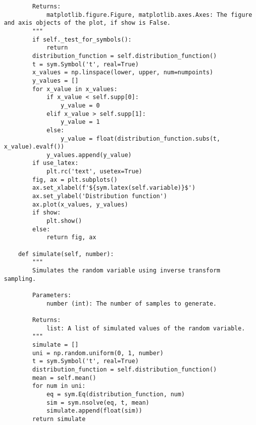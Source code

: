 \begin{small}
\begin{lstlisting}
        Returns:
            matplotlib.figure.Figure, matplotlib.axes.Axes: The figure and axis objects of the plot, if show is False.
        """
        if self._test_for_symbols():
            return
        distribution_function = self.distribution_function()
        t = sym.Symbol('t', real=True)
        x_values = np.linspace(lower, upper, num=numpoints)
        y_values = []
        for x_value in x_values:
            if x_value < self.supp[0]:
                y_value = 0
            elif x_value > self.supp[1]:
                y_value = 1
            else:
                y_value = float(distribution_function.subs(t, x_value).evalf())
            y_values.append(y_value)
        if use_latex:
            plt.rc('text', usetex=True)
        fig, ax = plt.subplots()
        ax.set_xlabel(f'${sym.latex(self.variable)}$')
        ax.set_ylabel('Distribution function')
        ax.plot(x_values, y_values)
        if show:
            plt.show()
        else:
            return fig, ax

    def simulate(self, number):
        """
        Simulates the random variable using inverse transform sampling.

        Parameters:
            number (int): The number of samples to generate.

        Returns:
            list: A list of simulated values of the random variable.
        """
        simulate = []
        uni = np.random.uniform(0, 1, number)
        t = sym.Symbol('t', real=True)
        distribution_function = self.distribution_function()
        mean = self.mean()
        for num in uni:
            eq = sym.Eq(distribution_function, num)
            sim = sym.nsolve(eq, t, mean)
            simulate.append(float(sim))
        return simulate
\end{lstlisting}
\end{small}

